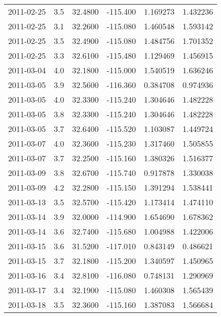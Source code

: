 \begin{tabular}{lrrrrr}
2011-02-25 &       3.5 &  32.4800 &  -115.400 &         1.169273 &         1.432236 \\
2011-02-25 &       3.1 &  32.2600 &  -115.080 &         1.460548 &         1.593142 \\
2011-02-25 &       3.5 &  32.4900 &  -115.080 &         1.484756 &         1.701352 \\
2011-02-25 &       3.3 &  32.6100 &  -115.480 &         1.129469 &         1.456915 \\
2011-03-04 &       4.0 &  32.1800 &  -115.000 &         1.540519 &         1.636246 \\
2011-03-05 &       3.9 &  32.5600 &  -116.360 &         0.384708 &         0.974936 \\
2011-03-05 &       4.0 &  32.3300 &  -115.240 &         1.304646 &         1.482228 \\
2011-03-05 &       3.8 &  32.3300 &  -115.240 &         1.304646 &         1.482228 \\
2011-03-05 &       3.7 &  32.6400 &  -115.520 &         1.103087 &         1.449724 \\
2011-03-07 &       4.0 &  32.3600 &  -115.230 &         1.317460 &         1.505855 \\
2011-03-07 &       3.7 &  32.2500 &  -115.160 &         1.380326 &         1.516377 \\
2011-03-09 &       3.8 &  32.6700 &  -115.740 &         0.917878 &         1.330038 \\
2011-03-09 &       4.2 &  32.2800 &  -115.150 &         1.391294 &         1.538441 \\
2011-03-13 &       3.5 &  32.5700 &  -115.420 &         1.173414 &         1.474110 \\
2011-03-14 &       3.9 &  32.0000 &  -114.900 &         1.654690 &         1.678362 \\
2011-03-14 &       3.6 &  32.7400 &  -115.680 &         1.004988 &         1.422006 \\
2011-03-15 &       3.6 &  31.5200 &  -117.010 &         0.843149 &         0.486621 \\
2011-03-15 &       3.7 &  32.1800 &  -115.200 &         1.340597 &         1.450965 \\
2011-03-16 &       3.4 &  32.8100 &  -116.080 &         0.748131 &         1.290969 \\
2011-03-17 &       3.4 &  32.1900 &  -115.080 &         1.460308 &         1.565439 \\
2011-03-18 &       3.5 &  32.3600 &  -115.160 &         1.387083 &         1.566684 \\

\end{tabular}
